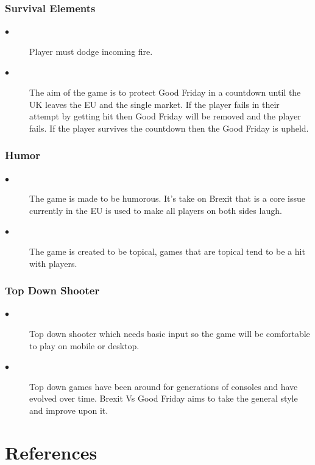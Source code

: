 \documentclass[a4paper]{scrreprt}
\begin{document}
        \subsection{Survival Elements}
            \begin{description}
                \item[$\bullet$] Player must dodge incoming fire.
                \item[$\bullet$] The aim of the game is to protect Good Friday in a countdown until the UK leaves the EU and the single market. If the player fails in their attempt by getting hit then Good Friday will be removed and the player fails. If the player survives the countdown then the Good Friday is upheld.
            \end{description}
        
        \subsection{Humor}
            \begin{description}
                \item[$\bullet$] The game is made to be humorous. It's take on Brexit that is a core issue currently in the EU is used to make all players on both sides laugh.
                \item[$\bullet$] The game is created to be topical, games that are topical tend to be a hit with players.
            \end{description}

        \subsection{Top Down Shooter}
            \begin{description}
                \item[$\bullet$] Top down shooter which needs basic input so the game will be comfortable to play on mobile or desktop.
                \item[$\bullet$] Top down games have been around for generations of consoles and have evolved over time. Brexit Vs Good Friday aims to take the general style and improve upon it.
            \end{description}

    \chapter{References} 
\end{document}
